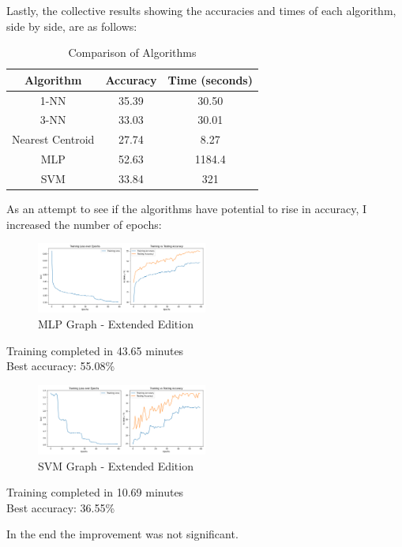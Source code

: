 \smallskip

Lastly, the collective results showing the accuracies and times of
each algorithm, side by side, are as follows:
\begin{table}[H]
    \centering
    \begin{tabular}{|c|c|c|}
        \hline
        Algorithm & Accuracy & Time (seconds) \\
        \hline
        1-NN & 35.39 & 30.50 \\
        3-NN & 33.03 & 30.01 \\
        Nearest Centroid & 27.74 & 8.27 \\
        MLP & 52.63 & 1184.4 \\
        SVM & 33.84 & 321 \\
        \hline
    \end{tabular}
    \vspace{0.5cm}
    \caption{Comparison of Algorithms}
\end{table}

As an attempt to see if the algorithms have potential to rise in accuracy,
I increased the number of epochs:
\begin{figure}[H]
    \centering
    \includegraphics[width=0.5\textwidth]{media/mlp_max.png}
    \caption{MLP Graph - Extended Edition}
\end{figure}
Training completed in 43.65 minutes \\
Best accuracy: 55.08\% \\

\begin{figure}[H]
    \centering
    \includegraphics[width=0.5\textwidth]{media/svm_max.png}
    \caption{SVM Graph - Extended Edition}
\end{figure}
Training completed in 10.69 minutes \\
Best accuracy: 36.55\% \\

\smallskip

In the end the improvement was not significant.
